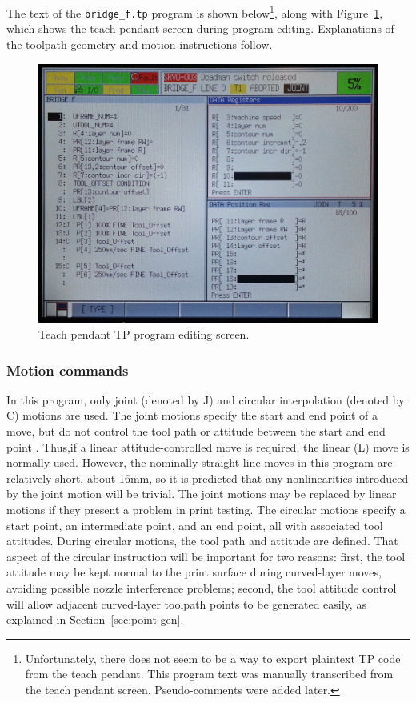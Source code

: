 The text of the \verb|bridge_f.tp| program is shown below\footnote{Unfortunately, there does not seem to be a way to export plaintext TP code from the teach pendant. This program text was manually transcribed from the teach pendant screen. Pseudo-comments were added later.}, along with Figure~\ref{fig:bridge-edit}, which shows the teach pendant screen during program editing. Explanations of the toolpath geometry and motion instructions follow.



\begin{figure}
    \centering
    \includegraphics[width=.8\linewidth]{figures/tp-screens/bridge-edit}
    \caption{Teach pendant TP program editing screen.}
    \label{fig:bridge-edit}
\end{figure}

\subsubsection{Motion commands}
In this program, only joint (denoted by J) and circular interpolation (denoted by C) motions are used. The joint motions specify the start and end point of a move, but do not control the tool path or attitude between the start and end point \cite[sec~4.3.1]{lr-handling-tool}. Thus,if a linear attitude-controlled move is required, the linear (L) move is normally used. However, the nominally straight-line moves in this program are relatively short, about 16mm, so it is predicted that any nonlinearities introduced by the joint motion will be trivial. The joint motions may be replaced by linear motions if they present a problem in print testing. The circular motions specify a start point, an intermediate point, and an end point, all with associated tool attitudes. During circular motions, the tool path and attitude are defined. That aspect of the circular instruction will be important for two reasons: first, the tool attitude may be kept normal to the print surface during curved-layer moves, avoiding possible nozzle interference problems; second, the tool attitude control will allow adjacent curved-layer toolpath points to be generated easily, as explained in Section~\ref{sec:point-gen}.

